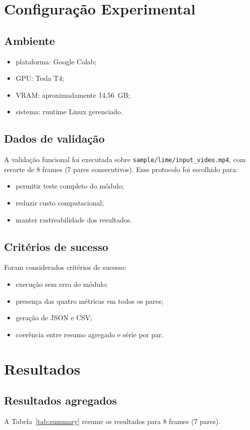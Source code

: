 \documentclass[conference]{IEEEtran}
\begin{document}
\section{Configuração Experimental}
\subsection{Ambiente}
\begin{itemize}
    \item plataforma: Google Colab;
    \item GPU: Tesla T4;
    \item VRAM: aproximadamente \SI{14.56}{GB};
    \item sistema: runtime Linux gerenciado.
\end{itemize}

\subsection{Dados de validação}
A validação funcional foi executada sobre \texttt{sample/lime/input\_video.mp4}, com recorte de 8 frames (7 pares consecutivos). Esse protocolo foi escolhido para:
\begin{itemize}
    \item permitir teste completo do módulo;
    \item reduzir custo computacional;
    \item manter rastreabilidade dos resultados.
\end{itemize}

\subsection{Critérios de sucesso}
Foram considerados critérios de sucesso:
\begin{itemize}
    \item execução sem erro do módulo;
    \item presença das quatro métricas em todos os pares;
    \item geração de JSON e CSV;
    \item coerência entre resumo agregado e série por par.
\end{itemize}

\section{Resultados}
\subsection{Resultados agregados}
A Tabela~\ref{tab:summary} resume os resultados para 8 frames (7 pares).
\end{document}
